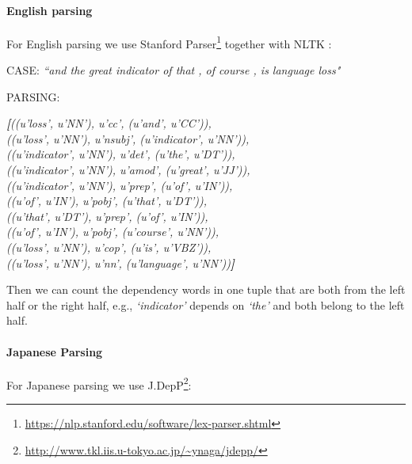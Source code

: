 \documentclass[11pt,a4paper]{article}
\begin{document}
\paragraph{English parsing} For English parsing we use Stanford Parser\footnote{\url{https://nlp.stanford.edu/software/lex-parser.shtml}} together with NLTK \cite{NLTK}:

CASE: \emph{``and the great indicator of that , of course , is language loss"}

PARSING:

\emph{\textbf{[}((u'loss', u'NN'), u'cc', (u'and', u'CC')), \\
((u'loss', u'NN'), u'nsubj', (u'indicator', u'NN')), \\
((u'indicator', u'NN'), u'det', (u'the', u'DT')), \\
((u'indicator', u'NN'), u'amod', (u'great', u'JJ')), \\
((u'indicator', u'NN'), u'prep', (u'of', u'IN')), \\
((u'of', u'IN'), u'pobj', (u'that', u'DT')), \\
((u'that', u'DT'), u'prep', (u'of', u'IN')), \\
((u'of', u'IN'), u'pobj', (u'course', u'NN')), \\
((u'loss', u'NN'), u'cop', (u'is', u'VBZ')), \\
((u'loss', u'NN'), u'nn', (u'language', u'NN'))\textbf{]}}

Then we can count the dependency words in one tuple that are both from the left half or the right half, e.g., \emph{`indicator'} depends on \emph{`the'} and both belong to the left half.

\paragraph{Japanese Parsing} For Japanese parsing we use J.DepP\footnote{\url{http://www.tkl.iis.u-tokyo.ac.jp/~ynaga/jdepp/}}:
\end{document}
